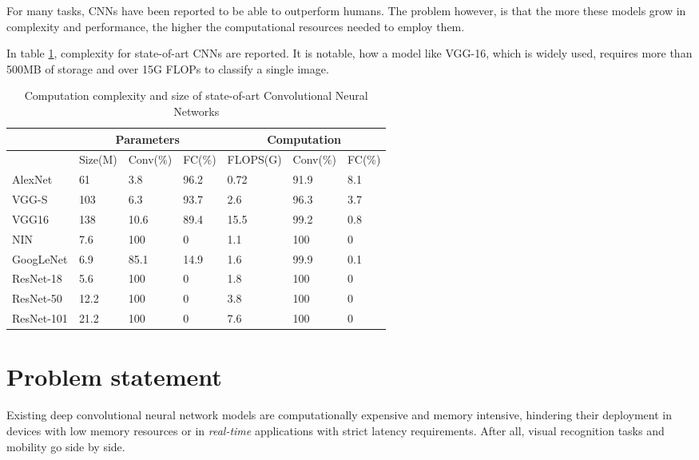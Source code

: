  For many tasks, CNNs have been reported to be able to outperform humans. The problem however, is that the more these models grow in complexity and performance, the higher the computational resources needed to employ them. 
 
 In table \ref{tab:survey}, complexity for state-of-art CNNs are reported. It is notable, how a model like VGG-16, which is widely used, requires more than 500MB of storage and over 15G FLOPs to classify a single image. 
 
 
\begin{table}[]
\centering
\caption{Computation complexity and size of state-of-art Convolutional Neural Networks}
\label{tab:survey}
\begin{tabular}{@{}lllllll@{}}
\toprule
           & \multicolumn{3}{c}{Parameters} & \multicolumn{3}{c}{Computation} \\ \midrule
           & Size(M)  & Conv(\%)  & FC(\%)  & FLOPS(G)  & Conv(\%)  & FC(\%)  \\
AlexNet    & 61       & 3.8       & 96.2    & 0.72      & 91.9      & 8.1     \\
VGG-S      & 103      & 6.3       & 93.7    & 2.6       & 96.3      & 3.7     \\
VGG16      & 138      & 10.6      & 89.4    & 15.5      & 99.2      & 0.8     \\
NIN        & 7.6      & 100       & 0       & 1.1       & 100       & 0       \\
GoogLeNet  & 6.9      & 85.1      & 14.9    & 1.6       & 99.9      & 0.1     \\
ResNet-18  & 5.6      & 100       & 0       & 1.8       & 100       & 0       \\
ResNet-50  & 12.2     & 100       & 0       & 3.8       & 100       & 0       \\
ResNet-101 & 21.2     & 100       & 0       & 7.6       & 100       & 0       \\ \bottomrule
\end{tabular}
\end{table}

 


\section{Problem statement}
Existing deep convolutional neural network models are computationally expensive and memory intensive, hindering their deployment in devices with low memory resources or in \emph{real-time} applications with strict latency requirements. After all, visual recognition tasks and mobility go side by side.
\newline 

